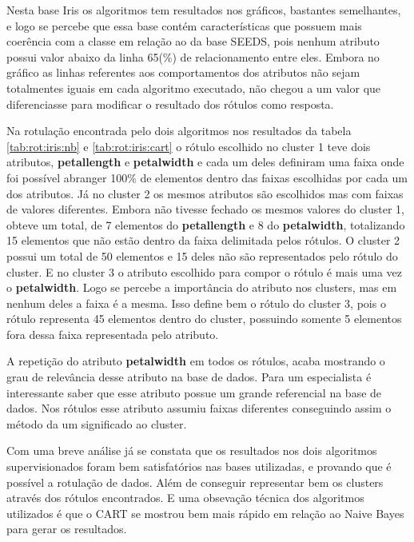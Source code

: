 Nesta base Iris os algoritmos tem resultados nos gráficos, bastantes semelhantes, e logo se percebe que essa base contém características que possuem mais coerência com  a classe em relação ao da base SEEDS, pois nenhum atributo possui valor abaixo da linha 65(\%) de relacionamento entre eles. Embora no gráfico as  linhas referentes aos comportamentos dos atributos não sejam totalmentes iguais em cada algoritmo executado, não chegou a um valor que diferenciasse  para modificar o resultado dos rótulos como resposta.

Na rotulação encontrada pelo dois algoritmos nos resultados da tabela \ref{tab:rot:iris:nb} e \ref{tab:rot:iris:cart} o rótulo escolhido no cluster 1 teve dois atributos, \textbf{petallength} e \textbf{petalwidth} e cada um deles definiram uma faixa onde foi possível abranger 100\% de elementos dentro das faixas escolhidas por cada um dos atributos. Já no cluster 2 os mesmos atributos são escolhidos mas com faixas de valores diferentes. Embora não tivesse fechado os mesmos valores do cluster 1, obteve um total, de 7 elementos do \textbf{petallength} e 8 do \textbf{petalwidth}, totalizando 15 elementos que não estão dentro da faixa delimitada pelos rótulos. O cluster 2 possui um total de 50 elementos e 15 deles não são representados pelo rótulo do cluster. E no cluster 3 o atributo escolhido para compor o rótulo é mais uma vez o \textbf{petalwidth}. Logo se percebe a importância do atributo nos clusters, mas em nenhum deles a faixa é a mesma. Isso define bem o rótulo do cluster 3, pois o rótulo representa 45 elementos dentro do cluster, possuindo somente 5 elementos fora dessa faixa representada pelo atributo.

A repetição do atributo \textbf{petalwidth} em todos os rótulos, acaba mostrando o grau de relevância desse atributo na base de dados. Para um especialista é interessante saber que esse atributo possue um grande referencial na base de dados. Nos rótulos esse atributo assumiu faixas diferentes conseguindo assim o método da um significado ao cluster. 

Com uma breve  análise já se constata que os resultados nos dois algoritmos supervisionados foram bem satisfatórios nas bases utilizadas, e  provando que é possível a rotulação de dados. Além de conseguir representar bem os clusters através dos rótulos encontrados. E uma obsevação técnica dos algoritmos utilizados é que o CART se mostrou bem mais rápido em relação ao Naive Bayes para gerar os resultados.






